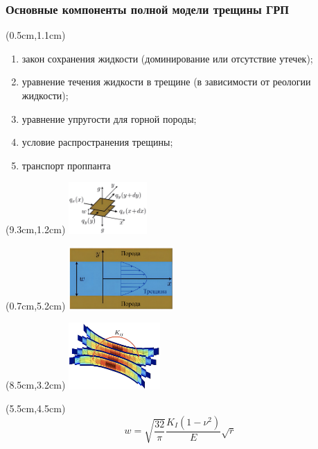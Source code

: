 \documentclass{beamer}
\begin{document}
\begin{frame}
\frametitle{Основные компоненты полной модели трещины ГРП}

\begin{textblock*}{8.8cm}(0.5cm,1.1cm)
\begin{enumerate}[1)]
	\item закон сохранения жидкости (доминирование или отсутствие утечек);
	\item уравнение течения жидкости в трещине (в зависимости от реологии жидкости);
	\item уравнение упругости для горной породы;
	\item условие распространения трещины;
	\item транспорт проппанта
\end{enumerate}
\end{textblock*}

\begin{textblock*}{3cm}(9.3cm,1.2cm)
\includegraphics[width=3cm]{part1_balance.jpg}
\end{textblock*}

\begin{textblock*}{4cm}(0.7cm,5.2cm)
\includegraphics[width=4cm]{part2_flux.jpg}
\end{textblock*}

\begin{textblock*}{3.5cm}(8.5cm,3.2cm)
\includegraphics[width=3.5cm]{part3_elasticity.jpg}
\end{textblock*}


\begin{textblock*}{3cm}(5.5cm,4.5cm)
\tiny
$$
w=\sqrt{\frac{32}{\pi}}\frac{K_{I}\left(1-\nu^2\right)}{E}\sqrt{r}
$$
\normalsize
\end{textblock*}


\end{frame}
\end{document}
